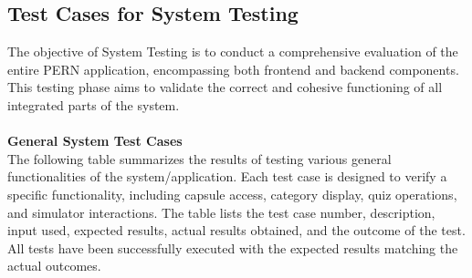 \subsection{Test Cases for System Testing}
The objective of System Testing is to conduct a comprehensive evaluation of the entire PERN application, encompassing both frontend and backend components. This testing phase aims to validate the correct and cohesive functioning of all integrated parts of the system.
\\
\\
\textbf{General System Test Cases}\\
The following table summarizes the results of testing various general functionalities of the system/application. Each test case is designed to verify a specific functionality, including capsule access, category display, quiz operations, and simulator interactions. The table lists the test case number, description, input used, expected results, actual results obtained, and the outcome of the test. All tests have been successfully executed with the expected results matching the actual outcomes.
